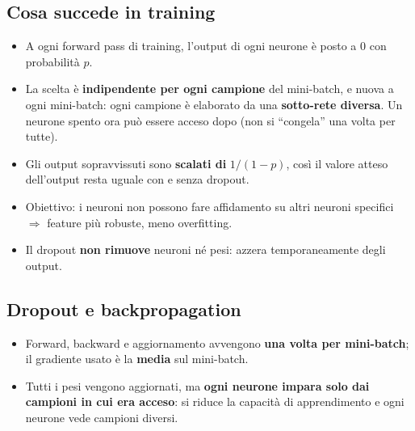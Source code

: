 \subsection{Cosa succede in training}
\begin{itemize}
  \item A ogni forward pass di training, l'output di ogni neurone è posto a 0 con probabilità $p$.
  \item La scelta è \textbf{indipendente per ogni campione} del mini-batch, e nuova a ogni mini-batch: ogni campione è elaborato da una
        \textbf{sotto-rete diversa}. Un neurone spento ora può essere acceso dopo (non si ``congela'' una volta per tutte).
  \item Gli output sopravvissuti sono \textbf{scalati di} $1/(1-p)$, così il valore atteso dell'output resta uguale con e senza dropout.
  \item Obiettivo: i neuroni non possono fare affidamento su altri neuroni specifici $\Rightarrow$ feature più robuste, meno overfitting.
  \item Il dropout \textbf{non rimuove} neuroni né pesi: azzera temporaneamente degli output.
\end{itemize}

\subsection{Dropout e backpropagation}
\begin{itemize}
  \item Forward, backward e aggiornamento avvengono \textbf{una volta per mini-batch}; il gradiente usato è la \textbf{media} sul mini-batch.
  \item Tutti i pesi vengono aggiornati, ma \textbf{ogni neurone impara solo dai campioni in cui era acceso}: si riduce la capacità di
        apprendimento e ogni neurone vede campioni diversi.
\end{itemize}

